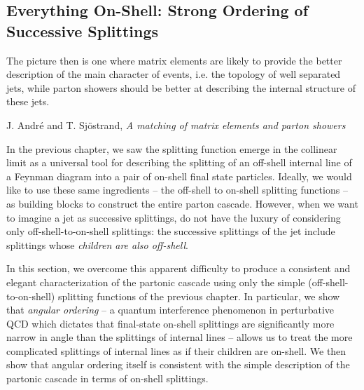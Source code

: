 \subsection{Everything On-Shell: Strong Ordering of Successive Splittings}
\label{sec:angular-ordering}

\epigraph{The picture then is one where matrix elements are likely to provide the better description of the main character of events, i.e. the topology of well separated jets, while parton showers should be better at describing the internal structure of these jets.}{J. Andr\'e and T. Sj\"ostrand, \textit{A matching of matrix elements and parton showers} \cite{}}





In the previous chapter, we saw the splitting function emerge in the collinear limit as a universal tool for describing the splitting of an off-shell internal line of a Feynman diagram into a pair of on-shell final state particles.
%
Ideally, we would like to use these same ingredients -- the off-shell to on-shell splitting functions -- as building blocks to construct the entire parton cascade.
%
However, when we want to imagine a jet as successive splittings, do not have the luxury of considering only off-shell-to-on-shell splittings:
%
the successive splittings of the jet include splittings whose \textit{children are also off-shell}.

In this section, we overcome this apparent difficulty to produce a consistent and elegant characterization of the partonic cascade using only the simple (off-shell-to-on-shell) splitting functions of the previous chapter.
%
In particular, we show that \textit{angular ordering} -- a quantum interference phenomenon in perturbative QCD which dictates that final-state on-shell splittings are significantly more narrow in angle than the splittings of internal lines -- allows us to treat the more complicated splittings of internal lines as if their children are on-shell.
%
We then show that angular ordering itself is consistent with the simple description of the partonic cascade in terms of on-shell splittings.

